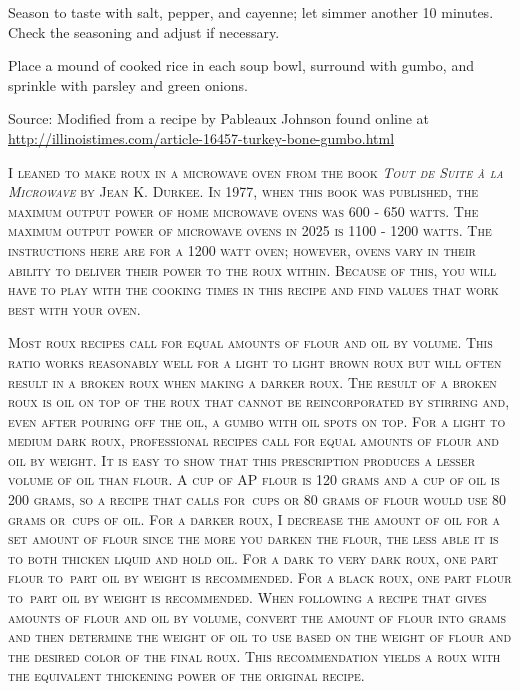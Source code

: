\documentclass[letterpaper]{recipePMG}
\newcommand{\third}{\nicefrac{1}{3} \,}
\newcommand{\half}{\nicefrac{1}{2} \,}
\newcommand{\twothirds}{\nicefrac{2}{3} \,}
\newcommand{\twofifths}{\nicefrac{2}{5} \,}
\begin{document}
Season to taste with salt, pepper, and cayenne; let simmer another 10 minutes. Check the seasoning and adjust if necessary.

Place a mound of cooked rice in each soup bowl, surround with gumbo, and sprinkle with parsley and green onions.

Source: Modified from a recipe by Pableaux Johnson found online at \url{http://illinoistimes.com/article-16457-turkey-bone-gumbo.html}

\newpage

\label{DarkRoux}

\textsc{I leaned to make roux in a microwave oven from the book \textit{Tout de Suite \`{a} la Microwave} by Jean K. Durkee. In 1977, when this book was published, the maximum output power of home microwave ovens was 600 - 650 watts. The maximum output power of microwave ovens in 2025 is 1100 - 1200 watts. The instructions here are for a 1200 watt oven; however, ovens vary in their ability to deliver their power to the roux within. Because of this, you will have to play with the cooking times in this recipe and find values that work best with your oven. }

\textsc{Most roux recipes call for equal amounts of flour and oil by volume.  This ratio works reasonably well for a light to light brown roux but will often result in a broken roux when making a darker roux. The result of a broken roux is oil on top of the roux that cannot be reincorporated by stirring and, even after pouring off the oil, a gumbo with oil spots on top. For a light to medium dark roux, professional recipes call for equal amounts of flour and oil by weight. It is easy to show that this prescription produces a lesser volume of oil than flour.  A cup of AP flour is 120 grams and a cup of oil is 200 grams, so a recipe that calls for \twothirds cups or 80 grams of flour would use 80 grams or \twofifths cups of oil. For a darker roux, I decrease the amount of oil for a set amount of flour since the more you darken the flour, the less able it is to both thicken liquid and hold oil. For a dark to very dark roux, one part flour  to \half part oil by weight is recommended. For a black roux, one part flour to \third part oil by weight is recommended. When following a recipe that gives amounts of flour and oil by volume, convert the amount of flour into grams and then determine the weight of oil to use based on the weight of flour and the desired color of the final roux. This recommendation yields a roux with the equivalent thickening power of the original recipe.}
\end{document}
